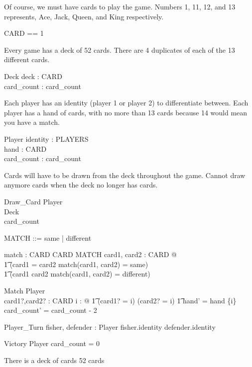 \documentclass{article}
\begin{document}
Of course, we must have cards to play the game.
Numbers 1, 11, 12, and 13 represents, Ace, Jack, Queen, and King respectively.
\begin{zed}
    CARD == 1\\
\end{zed}

Every game has a deck of 52 cards. There are 4 duplicates of each of
the 13 different cards.
\begin{schema}{Deck}
    deck : \seq CARD \\
    card\_count : \nat
    \where
    card\_count 
\end{schema}

Each player has an identity (player 1 or player 2) to
differentiate between. Each player has a hand of cards, with
no more than 13 cards because 14 would mean you have a match.

\begin{schema}{Player}
    identity : PLAYERS \\
    hand : \power CARD \\
    card\_count : \nat
    \where
    card\_count  \\
\end{schema}

Cards will have to be drawn from the deck throughout the game.
Cannot draw anymore cards when the deck no longer has cards.
\begin{schema}{Draw\_Card}
    \Delta Player\\
    \Delta Deck\\
    \where
    card\_count 
\end{schema}

\begin{zed}
    MATCH ::= same | different
\end{zed}

\begin{axdef}
    match : CARD \cross CARD \fun MATCH
    \where
    \forall card1, card2 : CARD @ \\
    \t1 (card1 = card2 \land match(card1, card2) = same) \lor \\
    \t1 (card1 \neq card2 \land match(card1, card2) = different)
\end{axdef}

\begin{schema}{Match}
    \Delta Player \\
    card1?,card2? : CARD
    \where
    \forall i : \nat @
    \t1 (card1? = i) \iff (card2? = i) \land
    \t1 hand' = hand \setminus \{i\} \\ 
    card\_count' = card\_count - 2 \\
\end{schema}

\begin{schema}{Player\_Turn}
    fisher, defender : Player
    \where
    fisher.identity \neq defender.identity\\
\end{schema}

\begin{schema}{Victory}
    \Xi Player
    \where
    card\_count = 0
\end{schema}

There is a deck of cards 52 cards
\end{document}
